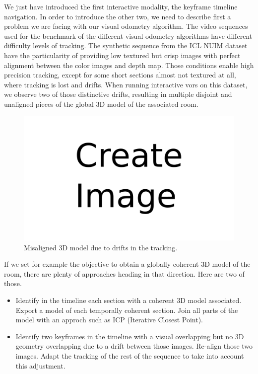We just have introduced the first interactive modality, the keyframe timeline navigation.
In order to introduce the other two, we need to describe first
a problem we are facing with our visual odometry algorithm.
The video sequences used for the benchmark of the different visual odometry algorithms
have different difficulty levels of tracking.
The synthetic sequence from the ICL NUIM dataset
have the particularity of providing low textured but crisp images with perfect alignment
between the color images and depth map.
Those conditions enable high precision tracking, except for some short sections
almost not textured at all, where tracking is lost and drifts.
When running interactive vors on this dataset,
we observe two of those distinctive drifts, resulting in multiple
disjoint and unaligned pieces of the global 3D model of the associated room.

\begin{figure}[h]
	\centering
	\includegraphics[width=\linewidth]{assets/img/todo.png}
	\caption{Misaligned 3D model due to drifts in the tracking.}%
	\label{fig:drift_icl_nuim}
\end{figure}

If we set for example the objective to obtain a globally coherent 3D model of the room,
there are plenty of approaches heading in that direction.
Here are two of those.

\begin{itemize}
	\item Identify in the timeline each section with a coherent 3D model associated.
		Export a model of each temporally coherent section.
		Join all parts of the model with an approch such as ICP (Iterative Closest Point).
	\item Identify two keyframes in the timeline with a visual overlapping
		but no 3D geometry overlapping due to a drift between those images.
		Re-align those two images.
		Adapt the tracking of the rest of the sequence to take into account this adjustment.
\end{itemize}

